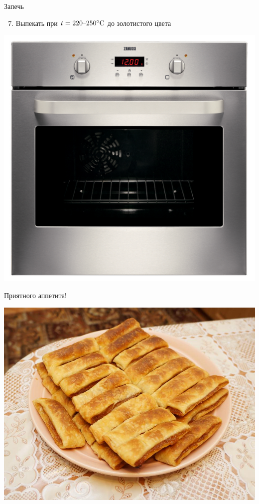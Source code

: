 \documentclass[usenames,dvipsnames,pdftex,unicode,hidelinks]{beamer}
\newcommand{\operation}[2]{
    \begin{enumerate}
        \setcounter{enumi}{#1}
      \item #2
    \end{enumerate}
  }
\begin{document}
  \begin{frame}{Запечь}
    \begin{center}
      \operation{6}{Выпекать при $t = 220\text{--}250\celsius$ до
      \textcolor{Goldenrod!70!Sepia}{золотистого цвета}}

      \includegraphics[height=0.7\textheight]{oven}
    \end{center}
  \end{frame}

  \begin{frame}{Приятного аппетита!}
    \begin{center}
      \includegraphics[height=0.82\textheight]{result}
    \end{center}
  \end{frame}
\end{document}
